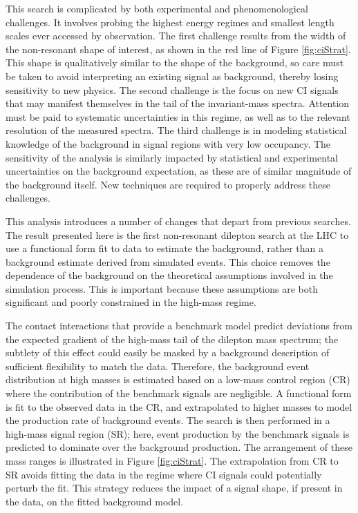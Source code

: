 This search is complicated by both experimental and phenomenological challenges.
It involves probing the highest energy regimes and smallest length scales ever accessed by observation.
The first challenge results from the width of the non-resonant shape of interest, as shown in the red line of Figure \ref{fig:ciStrat}.
This shape is qualitatively similar to the shape of the background, so care must be taken to avoid interpreting an existing signal as background, thereby losing sensitivity to new physics.
The second challenge is the focus on new CI signals that may manifest themselves in the tail of the invariant-mass spectra.
Attention must be paid to systematic uncertainties in this regime, as well as to the relevant resolution of the measured spectra.
The third challenge is in modeling statistical knowledge of the background in signal regions with very low occupancy.
The sensitivity of the analysis is similarly impacted by statistical and experimental uncertainties on the background expectation, as these are of similar magnitude of the background itself.
New techniques are required to properly address these challenges.

This analysis introduces a number of changes that depart from previous searches.
The result presented here is the first non-resonant dilepton search at the LHC to use a functional form fit to data to estimate the background, rather than a background estimate derived from simulated events.
This choice removes the dependence of the background on the theoretical assumptions involved in the simulation process.
This is important because these assumptions are both significant and poorly constrained in the high-mass regime.

The contact interactions that provide a benchmark model predict deviations from the expected gradient of the high-mass tail of the dilepton mass spectrum; the subtlety of this effect could easily be masked by a background description of sufficient flexibility to match the data.
Therefore, the background event distribution at high masses is estimated based on a low-mass control region (CR) where the contribution of the benchmark signals are negligible.
A functional form is fit to the observed data in the CR, and extrapolated to higher masses to model the production rate of background events.
The search is then performed in a high-mass signal region (SR); here, event production by the benchmark signals is predicted to dominate over the background production.
The arrangement of these mass ranges is illustrated in Figure \ref{fig:ciStrat}.
The extrapolation from CR to SR avoids fitting the data in the regime where CI signals could potentially perturb the fit.
This strategy reduces the impact of a signal shape, if present in the data, on the fitted background model.

